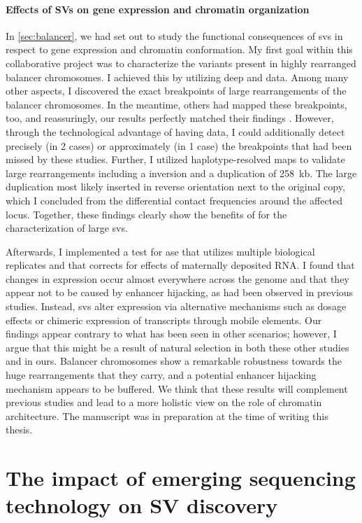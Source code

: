 \paragraph{Effects of SVs on gene expression and chromatin organization}
In \cref{sec:balancer}, we had set out to study the functional consequences of
\acp{sv} in respect to gene expression and chromatin conformation. My first goal
within this collaborative project was to characterize the variants present in
highly rearranged balancer chromosomes. I achieved this by utilizing deep \wgs
and \hic data. Among many other aspects, I discovered the exact breakpoints of
large rearrangements of the balancer chromosomes. In the meantime, others had
mapped these breakpoints, too, and reassuringly, our results perfectly matched
their findings \citep{Miller2016,Miller2018}. However, through the technological
advantage of having \hic data, I could additionally detect precisely (in 2
cases) or approximately (in 1 case) the breakpoints that had been missed by
these studies. Further, I utilized haplotype-resolved \hic maps to validate
large rearrangements including a inversion and a duplication of 258~kb. The
large duplication most likely inserted in reverse orientation next to the
original copy, which I concluded from the differential contact frequencies
around the affected locus. Together, these findings clearly show the benefits
of \hic for the characterization of large \acp{sv}.

Afterwards, I implemented a
test for \acl{ase} that utilizes multiple biological replicates and that
corrects for effects of maternally deposited RNA. I found that changes in
expression occur almost everywhere across the genome and that they appear not to
be caused by enhancer hijacking, as had been observed in previous studies.
Instead, \acp{sv} alter expression via alternative mechanisms such as dosage
effects or chimeric expression of transcripts through mobile elements. Our
findings appear contrary to what has been seen in other scenarios; however, I
argue that this might be a result of natural selection in both these other
studies and in ours. Balancer chromosomes show a remarkable robustness towards
the huge rearrangements that they carry, and a potential enhancer hijacking
mechanism appears to be buffered. We think that these results will complement
previous studies and lead to a more holistic view on the role of chromatin
architecture. The manuscript was in preparation at the time of writing this
thesis.







\section{The impact of emerging sequencing technology on SV discovery}
\label{sec:impact}
